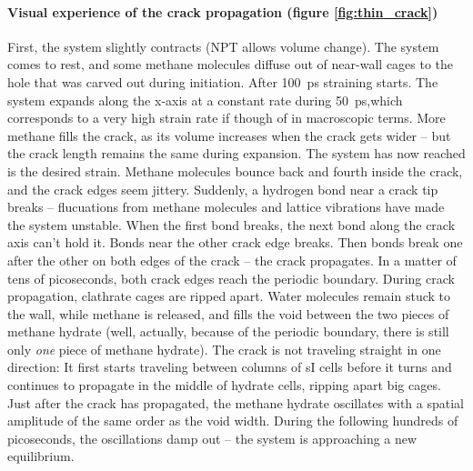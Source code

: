 \begin{framed}
\paragraph{Visual experience of the crack propagation (figure \ref{fig:thin_crack})}
First, the system slightly contracts (NPT allows volume change). The system comes to rest, and some methane molecules diffuse out of near-wall cages to the hole that was carved out during initiation. After \SI{100}{\pico\second} straining starts. The system expands along the x-axis at a constant rate during \SI{50}{\pico\second},which corresponds to a very high strain rate if though of in macroscopic terms. More methane fills the crack, as its volume increases when the crack gets wider -- but the crack length remains the same during expansion. The system has now reached is the desired strain. Methane molecules bounce back and fourth inside the crack, and the crack edges seem jittery. Suddenly, a hydrogen bond near a crack tip breaks -- flucuations from methane molecules and lattice vibrations have made the system unstable. When the first bond breaks, the next bond along the crack axis can't hold it. Bonds near the other crack edge breaks. Then bonds break one after the other on both edges of the crack -- the crack propagates. In a matter of tens of picoseconds, both crack edges reach the periodic boundary. During crack propagation, clathrate cages are ripped apart. Water molecules remain stuck to the wall, while methane is released, and fills the void between the two pieces of methane hydrate (well, actually, because of the periodic boundary, there is still only \emph{one} piece of methane hydrate). The crack is not traveling straight in one direction: It first starts traveling between columns of sI cells before it turns and continues to propagate in the middle of hydrate cells, ripping apart big cages. Just after the crack has propagated, the methane hydrate oscillates with a spatial amplitude of the same order as the void width. During the following hundreds of picoseconds, the oscillations damp out -- the system is approaching a new equilibrium.
\end{framed}

